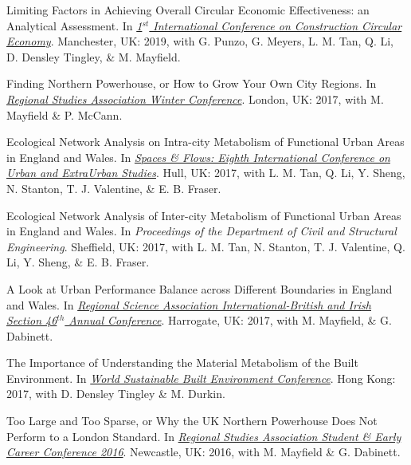 \documentclass[10pt]{article}
\begin{document}
\begin{etaremune}[leftmargin=0ex, topsep=0ex]
	\item Limiting Factors in Achieving Overall Circular Economic Effectiveness: an Analytical Assessment. In \emph{\href{http://www.confercare.manchester.ac.uk/events/iccce2019/programme/}{1$^{st}$ International Conference on Construction Circular Economy}}. Manchester, UK: 2019, with G. Punzo, G. Meyers, L. M. Tan, Q. Li, D. Densley Tingley, \& M. Mayfield.
	
	\item Finding Northern Powerhouse, or How to Grow Your Own City Regions. In \emph{\href{https://www.regionalstudies.org/events/rsa-winter-2017/}{Regional Studies Association Winter Conference}}. London, UK: 2017, with M. Mayfield \& P. McCann.
	
	\item Ecological Network Analysis on Intra-city Metabolism of Functional Urban Areas in England and Wales. In \emph{\href{https://spacesandflows.com/about/history/2017-conference}{Spaces \& Flows: Eighth International Conference on Urban and ExtraUrban Studies}}. Hull, UK: 2017, with L. M. Tan, Q. Li, Y. Sheng, N. Stanton, T. J. Valentine, \& E. B. Fraser.\label{c2rise.net}
	
	\item Ecological Network Analysis of Inter-city Metabolism of Functional Urban Areas in England and Wales. In \emph{Proceedings of the Department of Civil and Structural Engineering}. Sheffield, UK: 2017, with L. M. Tan, N. Stanton, T. J. Valentine, Q. Li, Y. Sheng, \& E. B. Fraser.\label{c1rise.net}
	
	\item A Look at Urban Performance Balance across Different Boundaries in England and Wales. In \emph{\href{http://www.rsai-bis.org/previous-conferences.html}{Regional Science Association International-British and Irish Section 46$^{th}$ Annual Conference}}. Harrogate, UK: 2017, with M. Mayfield, \& G. Dabinett.\label{rsai-bi}
	
	\item The Importance of Understanding the Material Metabolism of the Built Environment. In \emph{\href{https://www.wsbe17hongkong.hk/presentation-files}{World Sustainable Built Environment Conference}}. Hong Kong: 2017, with D. Densley Tingley \& M. Durkin.
	
	\item Too Large and Too Sparse, or Why the UK Northern Powerhouse Does Not Perform to a London Standard. In \emph{\href{https://www.regionalstudies.org/events/rsa-stud-ec-conf-2016/}{Regional Studies Association Student \& Early Career Conference 2016}}. Newcastle, UK: 2016, with M. Mayfield \& G. Dabinett. 
	

\end{etaremune}
\end{document}
